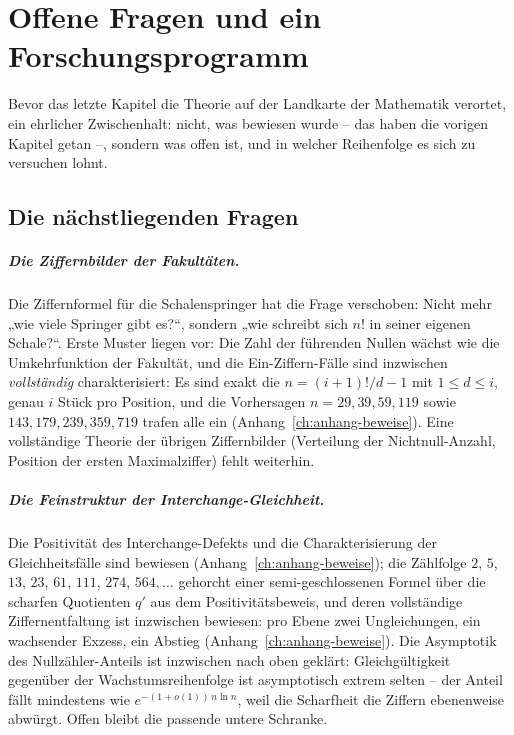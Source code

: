 \chapter{Offene Fragen und ein Forschungsprogramm}
\label{ch:offen}


Bevor das letzte Kapitel die Theorie auf der Landkarte der
Mathematik verortet, ein ehrlicher Zwischenhalt: nicht, was
bewiesen wurde -- das haben die vorigen Kapitel getan --, sondern
was offen ist, und in welcher Reihenfolge es sich zu versuchen
lohnt.

\section{Die nächstliegenden Fragen}

\paragraph{Die Ziffernbilder der Fakultäten.} Die Ziffernformel für
die Schalenspringer hat die Frage verschoben: Nicht mehr „wie viele
Springer gibt es?“, sondern „wie schreibt sich $n!$ in seiner
eigenen Schale?“. Erste Muster liegen vor: Die Zahl der führenden
Nullen wächst wie die Umkehrfunktion der Fakultät, und die
Ein-Ziffern-Fälle sind inzwischen \emph{vollständig}
charakterisiert: Es sind exakt die $n=(i+1)!/d-1$ mit $1\le d\le i$,
genau $i$ Stück pro Position, und die Vorhersagen $n=29,39,59,119$
sowie $143,179,239,359,719$ trafen alle ein
(Anhang~\ref{ch:anhang-beweise}). Eine vollständige Theorie der
übrigen Ziffernbilder (Verteilung der Nichtnull-Anzahl, Position der
ersten Maximalziffer) fehlt weiterhin.

\paragraph{Die Feinstruktur der Interchange-Gleichheit.} Die
Positivität des Interchange-Defekts und die Charakterisierung der
Gleichheitsfälle sind bewiesen (Anhang~\ref{ch:anhang-beweise});
die Zählfolge $2$, $5$, $13$, $23$, $61$, $111$, $274$,
$564,\ldots$ gehorcht einer semi-geschlossenen Formel über die
scharfen Quotienten $q'$ aus dem Positivitätsbeweis, und
deren vollständige Ziffernentfaltung ist inzwischen bewiesen: pro
Ebene zwei Ungleichungen, ein wachsender Exzess, ein Abstieg
(Anhang~\ref{ch:anhang-beweise}). Die Asymptotik des
Nullzähler-Anteils ist inzwischen nach oben geklärt: Gleichgültigkeit gegenüber der Wachstumsreihenfolge ist
asymptotisch extrem selten -- der Anteil fällt mindestens wie
$e^{-(1+o(1))\,n\ln n}$, weil die Scharfheit die Ziffern ebenenweise
abwürgt. Offen bleibt die passende untere Schranke.

